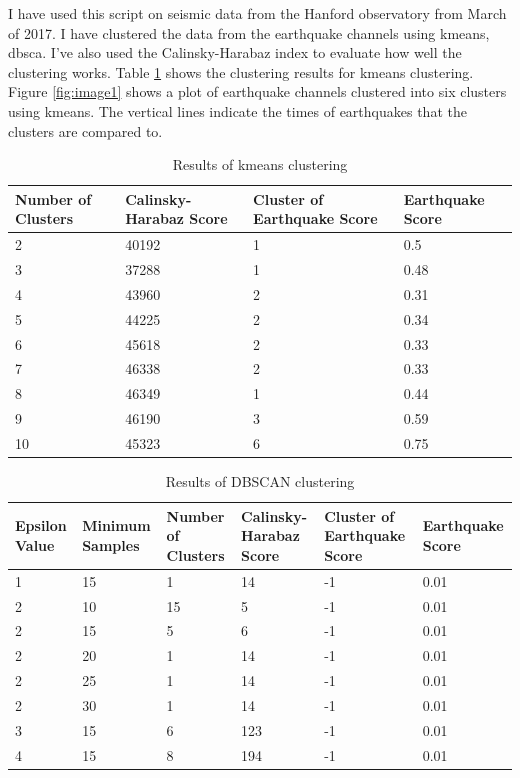 \documentclass[colorlinks=true,pdfstartview=FitV,linkcolor=blue,
            citecolor=red,urlcolor=magenta]{ligodoc}
\begin{document}
\par I have used this script on seismic data from the Hanford observatory from March of 2017. I have clustered the data from the earthquake channels using kmeans, dbsca. I've also used the Calinsky-Harabaz index to evaluate how well the clustering works. Table \ref{Table 1} shows the clustering results for kmeans clustering. Figure \ref{fig:image1} shows a plot of earthquake channels clustered into six clusters using kmeans. The vertical lines indicate the times of earthquakes that the clusters are compared to.

\begin{table}[h!]
\centering
 \begin{tabular}{| m{3.5cm} m{3.5cm} m{3.5cm} m{3.5cm}|} 
 \hline
 Number of Clusters & Calinsky-Harabaz Score & Cluster of Earthquake Score & Earthquake Score\\ [0.5ex] 
 \hline\hline
 2 & 40192 & 1 & 0.5\\ 
 \hline
 3 & 37288 & 1 & 0.48\\
 \hline
 4 & 43960 & 2 & 0.31\\
 \hline
 5 & 44225 & 2 & 0.34\\
 \hline
 6 & 45618 & 2 & 0.33\\ 
 \hline
 7 & 46338 & 2 & 0.33\\
 \hline
 8 & 46349 & 1 & 0.44\\
 \hline
 9 & 46190 & 3 & 0.59\\
 \hline
 10 & 45323 & 6 & 0.75\\
 \hline
 \end{tabular}
 \caption{Results of kmeans clustering}
 \label{Table 1}
\end{table}

\begin{table}[h!]
\centering
 \begin{tabular}{|m{2cm} m{2.25cm} m{2.25cm} m{2.25cm} m{2.25cm} m{2.25cm}|} 
 \hline
 Epsilon Value & Minimum Samples & Number of Clusters & Calinsky-Harabaz Score & Cluster of Earthquake Score & Earthquake Score\\ [0.5ex] 
 \hline\hline
 1 & 15 & 1 & 14 & -1 & 0.01\\ 
 \hline
 2 & 10 & 15  & 5 & -1 & 0.01\\
 \hline
 2 & 15 & 5 & 6 & -1 & 0.01\\ 
 \hline
 2 & 20 & 1 & 14 & -1 & 0.01\\
 \hline
 2 & 25 & 1 & 14 & -1 & 0.01\\
 \hline
 2 & 30 & 1 & 14 & -1 & 0.01\\
 \hline
 3 & 15 & 6 & 123 & -1 & 0.01\\
 \hline
 4 & 15 & 8 & 194 & -1 & 0.01\\
 \hline
 \end{tabular}
 \caption{Results of DBSCAN clustering}
 \label{Table 2}
\end{table}
\end{document}

